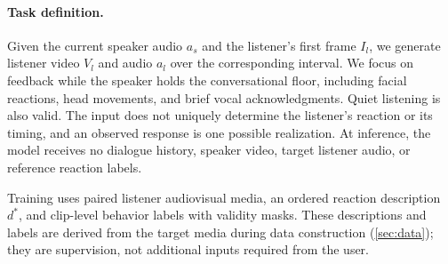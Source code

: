 \label{sec:task}
\paragraph{Task definition.}
Given the current speaker audio $a_s$ and the listener's first frame $I_l$,
we generate listener video $V_l$ and audio $a_l$ over the corresponding
interval. We focus on feedback while the speaker holds the conversational
floor, including facial reactions, head movements, and brief vocal
acknowledgments. Quiet listening is also valid. The input does not uniquely
determine the listener's reaction or its timing, and an observed response
is one possible realization. At inference, the model receives no dialogue
history, speaker video, target listener audio, or reference reaction labels.

Training uses paired listener audiovisual media, an ordered reaction
description $d^*$, and clip-level behavior labels with validity masks.
These descriptions and labels are derived from the target media during
data construction (\cref{sec:data}); they are supervision, not additional
inputs required from the user.
